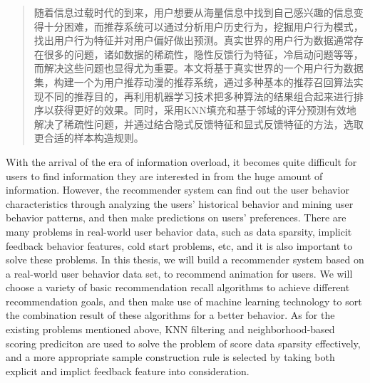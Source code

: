 
\begin{abstract}
  随着信息过载时代的到来，用户想要从海量信息中找到自己感兴趣的信息变得十分困难，而推荐系统可以通过分析用户历史行为，挖掘用户行为模式，找出用户行为特征并对用户偏好做出预测。真实世界的用户行为数据通常存在很多的问题，诸如数据的稀疏性，隐性反馈行为特征，冷启动问题等等，而解决这些问题也显得尤为重要。本文将基于真实世界的一个用户行为数据集，构建一个为用户推荐动漫的推荐系统，通过多种基本的推荐召回算法实现不同的推荐目的，再利用机器学习技术把多种算法的结果组合起来进行排序以获得更好的效果。同时，采用KNN填充和基于邻域的评分预测有效地解决了稀疏性问题，并通过结合隐式反馈特征和显式反馈特征的方法，选取更合适的样本构造规则。

\end{abstract}

\begin{enabstract}
  With the arrival of the era of information overload, it becomes quite difficult for users to find information they are interested in from the huge amount of information. However, the recommender system can find out the user behavior characteristics through analyzing the users' historical behavior and mining user behavior patterns, and then make predictions on users' preferences. There are many problems in real-world user behavior data, such as data sparsity, implicit feedback behavior features, cold start problems, etc, and it is also important to solve these problems. In this thesis, we will build a recommender system based on a real-world user behavior data set, to recommend animation for users. We will choose a variety of basic recommendation recall algorithms to achieve different recommendation goals, and then make use of machine learning technology to sort the combination result of these algorithms for a better behavior. As for the existing problems mentioned above, KNN filtering and neighborhood-based scoring prediciton are used to solve the problem of score data sparsity effectively, and a more appropriate sample construction rule is selected by taking both explicit and implict feedback feature into consideration.

\end{enabstract}

